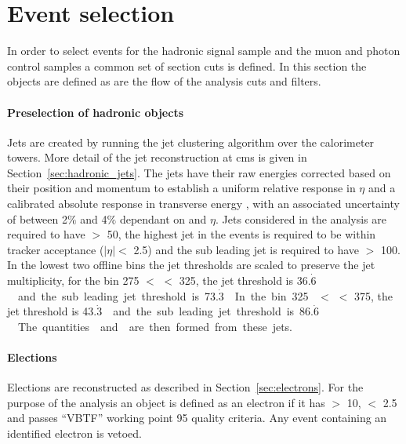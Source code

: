 
\section{Event selection} %
\label{sec:event_selection}
In order to select events for the hadronic signal sample and the muon and 
photon control samples a common set of section cuts is defined. In this section 
the objects are defined as are the flow of the analysis cuts and filters.

\paragraph{Preselection of hadronic objects} %
\label{par:Preselection_of_hadronic_objects}
Jets are created by running the \AK jet clustering 
algorithm\cite{Cacciari:2008ua} over the calorimeter towers. More detail of the 
jet reconstruction at \ac{cms} is given in Section~\ref{sec:hadronic_jets}. The 
jets have their raw energies corrected based on their position and momentum to 
establish a uniform relative response in $\eta$ and a calibrated absolute 
response in transverse energy \ET, with an associated uncertainty of between 
2$\%$ and 4$\%$ dependant on \ET and $\eta$\cite{Chatrchyan:2011ds}. Jets 
considered in the analysis are required to have \ET $>$ \unit{50}{\GeV}, the 
highest \ET jet in the events is required to be within tracker acceptance 
($|\eta| <$ 2.5) and the sub leading jet is required to have \ET $>$ 
\unit{100}{\GeV}. In the lowest two offline \HT bins the jet thresholds are scaled to preserve the jet multiplicity, for the bin \unit{275}{\GeV} $<$ \HT $<$ \unit{325}{\GeV}, the jet threshold is \unit{36.$\dot{6}$}{\GeV} and the sub leading jet threshold is \unit{73.$\dot{3}$}{\GeV}. In the bin \unit{325}{\GeV} $<$ \HT $<$ \unit{375}{\GeV}, the jet threshold is \unit{43.$\dot{3}$}{\GeV} and the sub leading jet threshold is \unit{86.$\dot{6}$}{\GeV}.

The quantities \HT and \HTm are then formed from these jets.

\paragraph{Elections} %
\label{par:elections}
Elections are reconstructed as described in Section~\ref{sec:electrons}. For 
the purpose of the analysis an object is defined as an electron if it has \PT 
$>$ \unit{10}{\GeV}, \mETA $<$ 2.5 and passes ``VBTF'' working point 95 quality 
criteria\cite{PAS-EGM-10-004}. Any event containing an identified electron is 
vetoed. 

